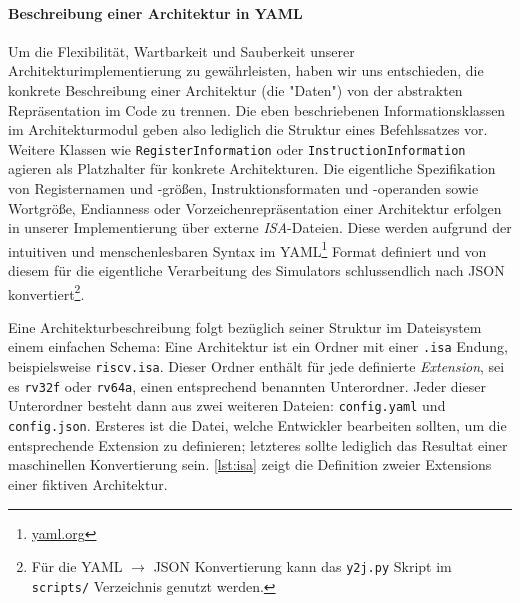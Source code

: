 
\paragraph{Beschreibung einer Architektur in YAML}
\label{dev:arch-yaml}

Um die Flexibilität, Wartbarkeit und Sauberkeit unserer
Architekturimplementierung zu gewährleisten, haben wir uns entschieden, die
konkrete Beschreibung einer Architektur (die "Daten") von der abstrakten
Repräsentation im Code zu trennen. Die eben
beschriebenen Informationsklassen im Architekturmodul geben also lediglich die Struktur
eines Befehlssatzes vor. Weitere Klassen wie \texttt{RegisterInformation} oder
\texttt{InstructionInformation} agieren als Platzhalter für konkrete Architekturen. 
Die eigentliche Spezifikation von Registernamen und -größen,
Instruktionsformaten und -operanden sowie Wortgröße, Endianness oder
Vorzeichenrepräsentation einer Architektur erfolgen in unserer Implementierung
über externe \emph{ISA}-Dateien. Diese werden aufgrund der intuitiven
und menschenlesbaren Syntax im YAML\footnote{\url{yaml.org}} Format definiert
und von diesem für die eigentliche Verarbeitung des Simulators schlussendlich
nach JSON konvertiert\footnote{Für die YAML $\rightarrow$ JSON Konvertierung kann das \texttt{y2j.py} Skript im \texttt{scripts/} Verzeichnis genutzt werden.}.

Eine Architekturbeschreibung folgt bezüglich seiner Struktur im Dateisystem
einem einfachen Schema: Eine Architektur ist ein Ordner mit einer \texttt{.isa}
Endung, beispielsweise \texttt{riscv.isa}. Dieser Ordner enthält für jede
definierte \emph{Extension}, sei es \texttt{rv32f} oder \texttt{rv64a}, einen
entsprechend benannten Unterordner. Jeder dieser Unterordner besteht dann aus
zwei weiteren Dateien: \texttt{config.yaml} und \texttt{config.json}. Ersteres
ist die Datei, welche Entwickler bearbeiten sollten, um die entsprechende
Extension zu definieren; letzteres sollte lediglich das Resultat einer
maschinellen Konvertierung sein. \autoref{lst:isa} zeigt die Definition zweier
Extensions einer fiktiven Architektur.

